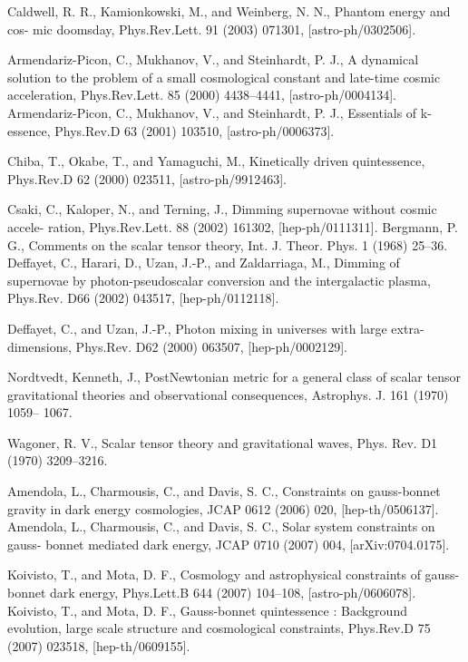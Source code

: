 \documentclass[a4paper,12pt]{report}
\theoremstyle{plain}
\theoremstyle{plain}
\begin{document}
\begin{thebibliography}{90}
 Caldwell, R. R., Kamionkowski, M., and Weinberg, N. N., Phantom energy and cos-
mic doomsday, Phys.Rev.Lett. 91 (2003) 071301, [astro-ph/0302506].

 Armendariz-Picon, C., Mukhanov, V., and Steinhardt, P. J., A dynamical solution
to the problem of a small cosmological constant and late-time cosmic acceleration,
Phys.Rev.Lett. 85 (2000) 4438–4441, [astro-ph/0004134].
 Armendariz-Picon, C., Mukhanov, V., and Steinhardt, P. J., Essentials of k-essence,
Phys.Rev.D 63 (2001) 103510, [astro-ph/0006373].

 Chiba, T., Okabe, T., and Yamaguchi, M., Kinetically driven quintessence,
Phys.Rev.D 62 (2000) 023511, [astro-ph/9912463].

 Csaki, C., Kaloper, N., and Terning, J., Dimming supernovae without cosmic accele-
ration, Phys.Rev.Lett. 88 (2002) 161302, [hep-ph/0111311].
 Bergmann, P. G., Comments on the scalar tensor theory, Int. J. Theor. Phys. 1 (1968)
25–36.
 Deffayet, C., Harari, D., Uzan, J.-P., and Zaldarriaga, M., Dimming of supernovae by
photon-pseudoscalar conversion and the intergalactic plasma, Phys.Rev. D66 (2002)
043517, [hep-ph/0112118].

 Deffayet, C., and Uzan, J.-P., Photon mixing in universes with large extra-dimensions,
Phys.Rev. D62 (2000) 063507, [hep-ph/0002129].

 Nordtvedt, Kenneth, J., PostNewtonian metric for a general class of scalar tensor
gravitational theories and observational consequences, Astrophys. J. 161 (1970) 1059–
1067.

 Wagoner, R. V., Scalar tensor theory and gravitational waves, Phys. Rev. D1 (1970)
3209–3216.

 Amendola, L., Charmousis, C., and Davis, S. C., Constraints on gauss-bonnet gravity
in dark energy cosmologies, JCAP 0612 (2006) 020, [hep-th/0506137].
 Amendola, L., Charmousis, C., and Davis, S. C., Solar system constraints on gauss-
bonnet mediated dark energy, JCAP 0710 (2007) 004, [arXiv:0704.0175].

 Koivisto, T., and Mota, D. F., Cosmology and astrophysical constraints of gauss-
bonnet dark energy, Phys.Lett.B 644 (2007) 104–108, [astro-ph/0606078].
 Koivisto, T., and Mota, D. F., Gauss-bonnet quintessence : Background evolution,
large scale structure and cosmological constraints, Phys.Rev.D 75 (2007) 023518,
[hep-th/0609155].


\end{thebibliography}
\end{document}

